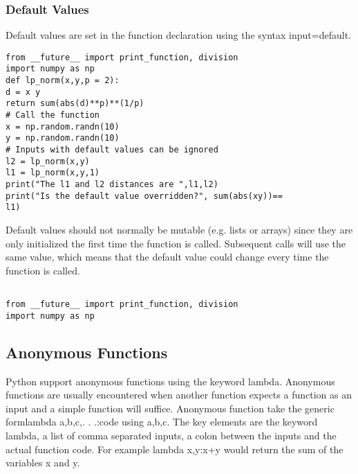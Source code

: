 \documentclass[KSmain.tex]{subfiles}
\begin{document}
\subsubsection{Default Values}
Default values are set in the function declaration using the syntax input=default.
\begin{framed}
\begin{verbatim}
from __future__ import print_function, division
import numpy as np
def lp_norm(x,y,p = 2):
d = x y
return sum(abs(d)**p)**(1/p)
# Call the function
x = np.random.randn(10)
y = np.random.randn(10)
# Inputs with default values can be ignored
l2 = lp_norm(x,y)
l1 = lp_norm(x,y,1)
print("The l1 and l2 distances are ",l1,l2)
print("Is the default value overridden?", sum(abs(xy))==
l1)
\end{verbatim}
\end{framed}

Default values should not normally be mutable (e.g. lists or arrays) since they are only initialized the first
time the function is called. Subsequent calls will use the same value, which means that the default value
could change every time the function is called.

\begin{framed}
\begin{verbatim}

from __future__ import print_function, division
import numpy as np
\end{verbatim}
\end{framed}
\newpage
\subsection{Anonymous Functions}

Python support anonymous functions using the keyword lambda. Anonymous functions are usually encountered
when another function expects a function as an input and a simple function will suffice. Anonymous
function take the generic formlambda a,b,c,. . .:code using a,b,c. The key elements are the keyword
lambda, a list of comma separated inputs, a colon between the inputs and the actual function code. For
example lambda x,y:x+y would return the sum of the variables x and y.
\end{document}
